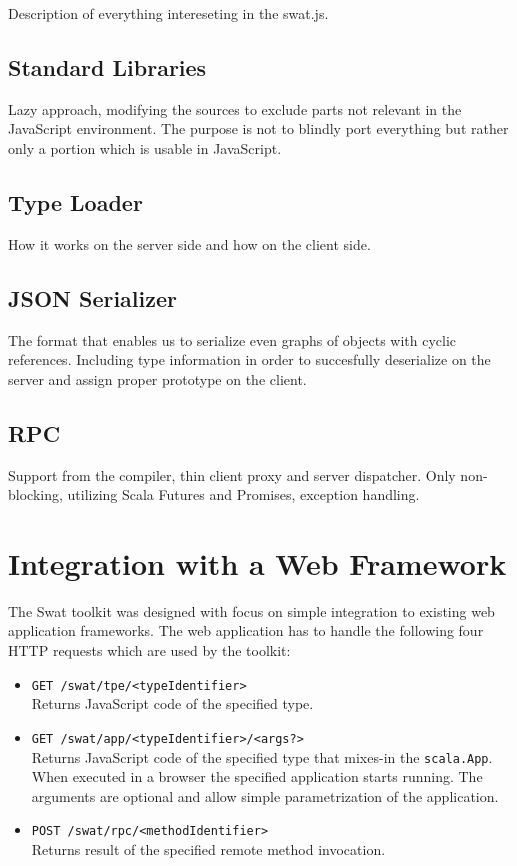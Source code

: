 \documentclass[12pt,a4paper]{report}
\begin{document}
Description of everything intereseting in the swat.js.

\subsection{Standard Libraries}

Lazy approach, modifying the sources to exclude parts not relevant in the JavaScript environment. The purpose is not to blindly port everything but rather only a portion which is usable in JavaScript.

\subsection{Type Loader}

How it works on the server side and how on the client side.

\subsection{JSON Serializer}

The format that enables us to serialize even graphs of objects with cyclic references. Including type information in order to succesfully deserialize on the server and assign proper prototype on the client.

\subsection{RPC}

Support from the compiler, thin client proxy and server dispatcher. Only non-blocking, utilizing Scala Futures and Promises, exception handling.

\section{Integration with a Web Framework}

The Swat toolkit was designed with focus on simple integration to existing web application frameworks. The web application has to handle the following four HTTP requests which are used by the toolkit:

\begin{itemize}
\item \texttt{GET /swat/tpe/<typeIdentifier>}\\
Returns JavaScript code of the specified type.
\item \texttt{GET /swat/app/<typeIdentifier>/<args?>}\\
Returns JavaScript code of the specified type that mixes-in the \texttt{scala.App}. When executed in a browser the specified application starts running. The arguments are optional and allow simple parametrization of the application.
\item \texttt{POST /swat/rpc/<methodIdentifier>}\\
Returns result of the specified remote method invocation.  
\end{itemize}
\end{document}
